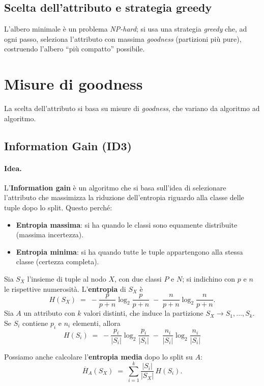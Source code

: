 \subsection{Scelta dell’attributo e strategia greedy}\label{subsec:greedy}
L’albero minimale è un problema \emph{NP-hard}; si usa una strategia \emph{greedy} che, ad ogni passo, seleziona l’attributo con massima \emph{goodness} (partizioni più pure),
costruendo l’albero “più compatto” possibile.

\section{Misure di goodness}\label{sec:goodness}
La scelta dell’attributo si basa su misure di \emph{goodness}, che variano da algoritmo ad algoritmo.

\subsection{Information Gain (ID3)}\label{subsec:ig}
\paragraph{Idea.} L'\textbf{Information gain} è un algoritmo che si basa sull'idea di selezionare l'attributo che massimizza la riduzione dell'entropia riguardo alla classe delle tuple dopo lo split. Questo perché:
\begin{itemize}
  \item \textbf{Entropia massima}: si ha quando le classi sono equamente distribuite (massima incertezza).
  \item \textbf{Entropia minima}: si ha quando tutte le tuple appartengono alla stessa classe (certezza completa). 
\end{itemize}

\noindent
Sia $S_X$ l’insieme di tuple al nodo $X$, con due classi $P$ e $N$; si indichino con $p$
e $n$ le rispettive numerosità. L’\textbf{entropia} di $S_X$ è
\[
H(S_X)\;=\; -\frac{p}{p+n}\log_2\!\frac{p}{p+n}\;-\;\frac{n}{p+n}\log_2\!\frac{n}{p+n}.
\]
Sia $A$ un attributo con $k$ valori distinti, che induce la partizione
$S_X \to S_1,\dots,S_k$. Se $S_i$ contiene $p_i$ e $n_i$ elementi, allora
\[
H(S_i)\;=\; -\frac{p_i}{|S_i|}\log_2\!\frac{p_i}{|S_i|}\;-\;\frac{n_i}{|S_i|}\log_2\!\frac{n_i}{|S_i|}
\]

Possiamo anche calcolare l'\textbf{entropia media} dopo lo split su $A$:
\[
\overline{H}_A(S_X)\;=\;\sum_{i=1}^k \frac{|S_i|}{|S_X|}\,H(S_i).
\]


